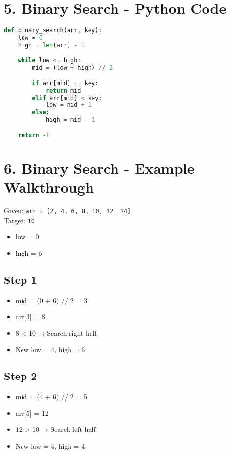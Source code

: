 \documentclass[14pt]{extarticle}
\begin{document}
\section*{5. Binary Search - Python Code}

\begin{lstlisting}[language=Python]
def binary_search(arr, key):
    low = 0
    high = len(arr) - 1

    while low <= high:
        mid = (low + high) // 2

        if arr[mid] == key:
            return mid
        elif arr[mid] < key:
            low = mid + 1
        else:
            high = mid - 1

    return -1
\end{lstlisting}

\newpage
\section*{6. Binary Search - Example Walkthrough}

Given: \texttt{arr = [2, 4, 6, 8, 10, 12, 14]} \\
Target: \texttt{10}

\begin{tcolorbox}[colback=white, colframe=black, title=Initial Setup]
\begin{itemize}
    \item low = 0
    \item high = 6
\end{itemize}
\end{tcolorbox}

\subsection*{Step 1}
\begin{itemize}
    \item mid = (0 + 6) // 2 = 3
    \item arr[3] = 8
    \item 8 < 10 → Search right half
    \item New low = 4, high = 6
\end{itemize}

\subsection*{Step 2}
\begin{itemize}
    \item mid = (4 + 6) // 2 = 5
    \item arr[5] = 12
    \item 12 > 10 → Search left half
    \item New low = 4, high = 4
\end{itemize}
\end{document}
